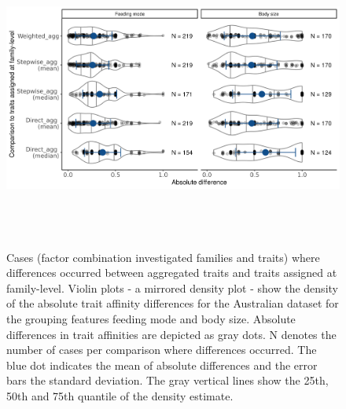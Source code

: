 \documentclass{article}
\begin{document}
\begin{figure}[H]
  \centering
  \includegraphics[width=16.5cm, height=10cm]{Deviances_trait_agg_chessman.png}
  \caption{Cases (factor combination investigated families and traits) where differences occurred between aggregated traits and traits assigned at family-level. Violin plots - a mirrored density plot - show the density of the absolute trait affinity differences for the Australian dataset for the grouping features feeding mode and body size. Absolute differences in trait affinities are depicted as gray dots. N denotes the number of cases per comparison where differences occurred. The blue dot indicates the mean of absolute differences and the error bars the standard deviation. The gray vertical lines show the 25th, 50th and 75th quantile of the density estimate.}
  \label{fig:diff_aggr_traits_chessman}
\end{figure}
\end{document}
